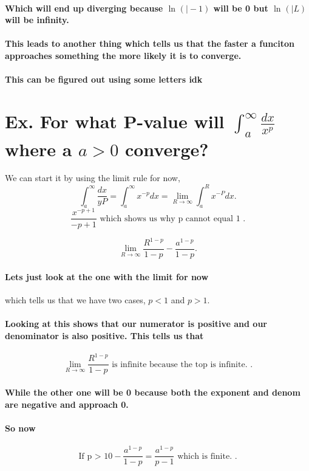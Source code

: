 \documentclass[a4paper]{article}
\begin{document}
\paragraph{Which will end up diverging because $\ln^{}(  \mid -1)$ will be 0 but $\ln^{}( \mid L)$ will be infinity. }
\paragraph{This leads to another thing which tells us that the faster a funciton approaches something the more likely it is to converge.}
\newpage
\paragraph{This can be figured out using some letters idk}
\section{Ex. For what P-value will $\int_{a}^{\infty} \frac{dx}{x^{p}} $ where a $a>0$ converge?}%
We can start it by using the limit rule for now,
\[
\int_{a}^{\infty} \frac{dx}{yP}=\int_{a}^{\infty} x^{-p}dx=\lim_{R \to \infty} \int_{a}^{R} x^{-P}dx   
.\] 
\[
\frac{x^{-p+1}}{-p+1}\text{ which shows us why p cannot equal 1 }
.\]

\[
\lim_{R \to \infty} \frac{R^{1-p}}{1-p}-\frac{a^{1-p}}{1-p} 
.\] 

\paragraph{Lets just look at the one with the limit for now}

which tells us that we have two cases, $p<1$ and $p>1$.  
\paragraph{Looking at this shows that our numerator is positive and our denominator is also positive. This tells us that}

\[
\lim_{R \to \infty} \frac{R^{1-p}}{1-p} \text{ is infinite because the top is infinite. }
.\] 

\paragraph{While the other one will be 0 because both the exponent and denom are negative and approach 0.}
\paragraph{So now}
\[
\text{If p > 1} 0-\frac{a^{1-p}}{1-p}= \frac{a^{1-p}}{p-1} \text{ which is finite. }
.\] 
\end{document}

